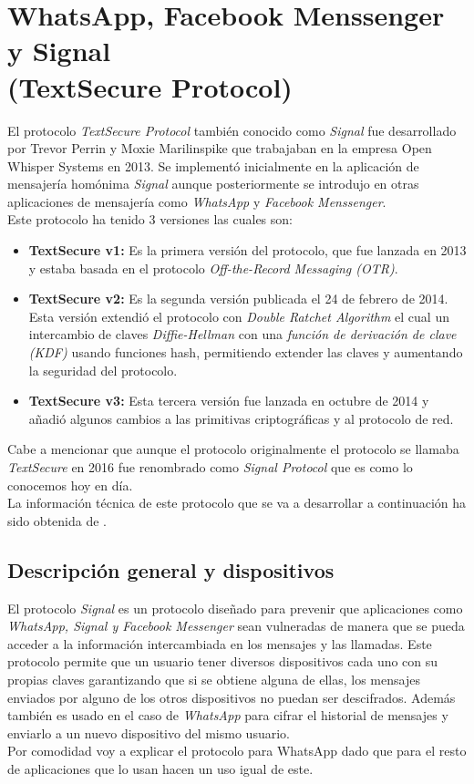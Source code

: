 \section{WhatsApp, Facebook Menssenger y Signal\\ (TextSecure Protocol)}
El protocolo \emph{TextSecure Protocol} también conocido como \emph{Signal} fue desarrollado por Trevor Perrin y Moxie Marilinspike que trabajaban en la empresa Open Whisper Systems en 2013. Se implementó inicialmente en la aplicación de mensajería homónima \emph{Signal} aunque posteriormente se introdujo en otras aplicaciones de mensajería como \emph{WhatsApp} y \emph{Facebook Menssenger}.\\
Este protocolo ha tenido 3 versiones las cuales son:
\begin{itemize}
	\item \textbf{TextSecure v1:} Es la primera versión del protocolo, que fue lanzada en 2013 y estaba basada en el protocolo \emph{Off-the-Record Messaging (OTR)}.
	\item \textbf{TextSecure v2:} Es la segunda versión publicada el 24 de febrero de 2014. Esta versión extendió el protocolo con \emph{Double Ratchet Algorithm} el cual un intercambio de claves \emph{Diffie-Hellman} con una \emph{función de derivación de clave (KDF)} usando funciones hash, permitiendo extender las claves y aumentando la seguridad del protocolo.
	\item \textbf{TextSecure v3:} Esta tercera versión fue lanzada en octubre de 2014 y añadió algunos cambios a las primitivas criptográficas y al protocolo de red.
\end{itemize}
Cabe a mencionar que aunque el protocolo originalmente el protocolo se llamaba \emph{TextSecure} en 2016 fue renombrado como \emph{Signal Protocol} que es como lo conocemos hoy en día.\\
La información técnica de este protocolo que se va a desarrollar a continuación ha sido obtenida de \cite{November2021b}.

\subsection{Descripción general y dispositivos}
El protocolo \emph{Signal} es un protocolo diseñado para prevenir que aplicaciones como \emph{WhatsApp, Signal y Facebook Messenger} sean vulneradas de manera que se pueda acceder a la información intercambiada en los mensajes y las llamadas. Este protocolo permite que un usuario tener diversos dispositivos cada uno con su propias claves garantizando que si se obtiene alguna de ellas, los mensajes enviados por alguno de los otros dispositivos no puedan ser descifrados. Además también es usado en el caso de \emph{WhatsApp} para cifrar el historial de mensajes y enviarlo a un nuevo dispositivo del mismo usuario.\\
Por comodidad voy a explicar el protocolo para WhatsApp dado que para el resto de aplicaciones que lo usan hacen un uso igual de este.\\

